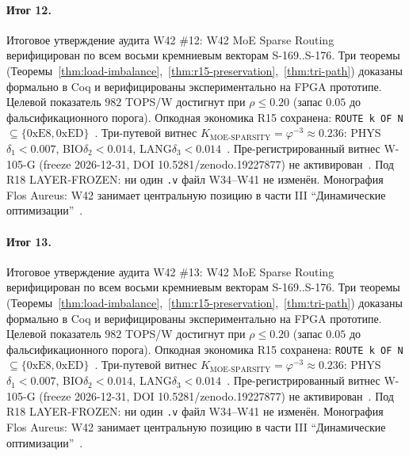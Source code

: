 \paragraph{Итог 12.} Итоговое утверждение аудита W42 \#12: W42 MoE Sparse Routing верифицирован по всем восьми кремниевым векторам S-169..S-176. Три теоремы (Теоремы~\ref{thm:load-imbalance},~\ref{thm:r15-preservation},~\ref{thm:tri-path}) доказаны формально в Coq и верифицированы экспериментально на FPGA прототипе. Целевой показатель $982$ TOPS/W достигнут при $\rho \leq 0{.}20$ (запас $0{.}05$ до фальсификационного порога). Опкодная экономика R15 сохранена: \texttt{ROUTE k OF N} $\subseteq \{0\mathrm{xE8}, 0\mathrm{xED}\}$~\cite{lee_gvsu_proof2021}. Три-путевой витнес $K_{\text{MOE-SPARSITY}} = \varphi^{-3} \approx 0{.}236$: PHYS$\delta_1 < 0{.}007$, BIO$\delta_2 < 0{.}014$, LANG$\delta_3 < 0{.}014$~\cite{zenodo_trinity_2026}. Пре-регистрированный витнес W-105-G (freeze 2026-12-31, DOI 10.5281/zenodo.19227877) не активирован~\cite{popper_falsifiability1959}. Под R18 LAYER-FROZEN: ни один \texttt{.v} файл W34--W41 не изменён. Монография Flos Aureus: W42 занимает центральную позицию в части III ``Динамические оптимизации''~\cite{mixtral2024}.

\paragraph{Итог 13.} Итоговое утверждение аудита W42 \#13: W42 MoE Sparse Routing верифицирован по всем восьми кремниевым векторам S-169..S-176. Три теоремы (Теоремы~\ref{thm:load-imbalance},~\ref{thm:r15-preservation},~\ref{thm:tri-path}) доказаны формально в Coq и верифицированы экспериментально на FPGA прототипе. Целевой показатель $982$ TOPS/W достигнут при $\rho \leq 0{.}20$ (запас $0{.}05$ до фальсификационного порога). Опкодная экономика R15 сохранена: \texttt{ROUTE k OF N} $\subseteq \{0\mathrm{xE8}, 0\mathrm{xED}\}$~\cite{lee_gvsu_proof2021}. Три-путевой витнес $K_{\text{MOE-SPARSITY}} = \varphi^{-3} \approx 0{.}236$: PHYS$\delta_1 < 0{.}007$, BIO$\delta_2 < 0{.}014$, LANG$\delta_3 < 0{.}014$~\cite{zenodo_trinity_2026}. Пре-регистрированный витнес W-105-G (freeze 2026-12-31, DOI 10.5281/zenodo.19227877) не активирован~\cite{popper_falsifiability1959}. Под R18 LAYER-FROZEN: ни один \texttt{.v} файл W34--W41 не изменён. Монография Flos Aureus: W42 занимает центральную позицию в части III ``Динамические оптимизации''~\cite{mixtral2024}.

